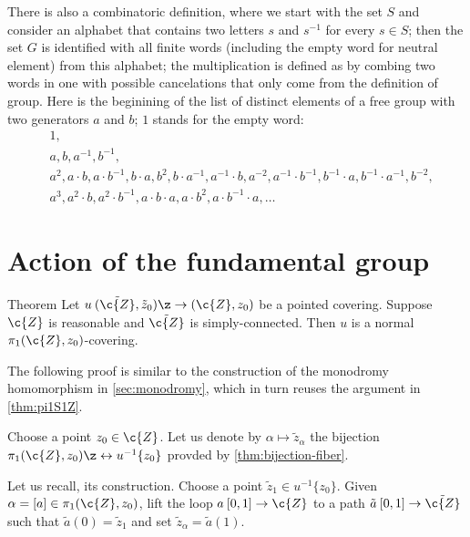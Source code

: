 There is also a combinatoric definition, where we start with the set $S$ and consider an alphabet that contains two letters $s$ and $s^{-1}$ for every $s\in S$; then
the set $G$ is identified with all finite words (including the empty word for neutral element) from this alphabet; the multiplication is defined as by combing two words in one with possible cancelations that only come from the definition of group.
Here is the beginining of the list of distinct elements of a free group with two generators $a$ and $b$; $1$ stands for the empty word:
\begin{align*}
&1,\\
&a, b, a^{-1}, b^{-1},\\
&a^2, a\cdot b, a\cdot b^{-1},
b\cdot a, b^2,b\cdot a^{-1},
a^{-1}\cdot b,a^{-2}, a^{-1}\cdot b^{-1},
b^{-1}\cdot a, b^{-1}\cdot a^{-1}, b^{-2},\\
&
a^3, a^2\cdot b, a^2\cdot b^{-1}, a\cdot b\cdot a,a\cdot b^{2},a\cdot b^{-1}\cdot a,  \dots
\end{align*}















\section{Action of the fundamental group}

\begin{thm}{Theorem}\label{thm:action-on-ucovering}
Let $u\:(\tilde{\c{Z}},\tilde z_0)\z\to (\c{Z},z_0)$ be a pointed covering.
Suppose $\c{Z}$ is reasonable and $\tilde{\c{Z}}$ is simply-connected.
Then $u$ is a normal $\pi_1(\c{Z},z_0)$-covering.
\end{thm}

The following proof is similar to the construction of the monodromy homomorphism in \ref{sec:monodromy}, which in turn reuses the argument in \ref{thm:pi1S1Z}.

Choose a point $z_0\in\c{Z}$.
Let us denote by $\alpha\mapsto \tilde z_\alpha$ the bijection $\pi_1(\c{Z},z_0)\z\leftrightarrow u^{-1}\{z_0\}$ provded by \ref{thm:bijection-fiber}.

Let us recall, its construction.
Choose a point $\tilde z_1\in u^{-1}\{z_0\}$.
Given $\alpha=[a]\in \pi_1(\c{Z},z_0)$,
lift the loop $a\:[0,1]\to\c{Z}$ to a path $\tilde a\:[0,1]\to \tilde{\c{Z}}$ such that $\tilde a(0)=\tilde z_1$ and set
$\tilde z_\alpha=\tilde a(1)$.

